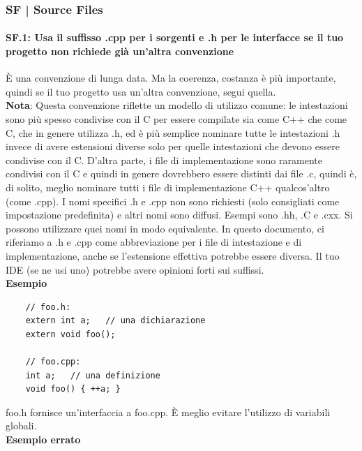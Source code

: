 \subsubsection{SF | Source Files}

\paragraph{SF.1: Usa il suffisso .cpp per i sorgenti e .h per le interfacce se il tuo progetto non richiede già un'altra convenzione}

\textsf{\small È una convenzione di lunga data. Ma la coerenza, costanza è più importante, quindi se il tuo progetto usa un'altra convenzione, segui quella. } \\

\textsf{\small \textbf{Nota}: Questa convenzione riflette un modello di utilizzo comune: le intestazioni sono più spesso condivise con il C per essere compilate sia come C++ che come C, che in genere utilizza .h, ed è più semplice nominare tutte le intestazioni .h invece di avere estensioni diverse solo per quelle intestazioni che devono essere condivise con il C. D'altra parte, i file di implementazione sono raramente condivisi con il C e quindi in genere dovrebbero essere distinti dai file .c, quindi è, di solito, meglio nominare tutti i file di implementazione C++ qualcos'altro (come .cpp). I nomi specifici .h e .cpp non sono richiesti (solo consigliati come impostazione predefinita) e altri nomi sono diffusi. Esempi sono .hh, .C e .cxx. Si possono utilizzare quei nomi in modo equivalente. In questo documento, ci riferiamo a .h e .cpp come abbreviazione per i file di intestazione e di implementazione, anche se l'estensione effettiva potrebbe essere diversa. Il tuo IDE (se ne usi uno) potrebbe avere opinioni forti sui suffissi.} \\

\textsf{\small \textbf{Esempio}}

\begin{lstlisting}
	// foo.h:
	extern int a;   // una dichiarazione
	extern void foo();
	
	// foo.cpp:
	int a;   // una definizione
	void foo() { ++a; }
\end{lstlisting}

\textsf{\small foo.h fornisce un'interfaccia a foo.cpp. È meglio evitare l'utilizzo di variabili globali.} \\

\textsf{\small \textbf{Esempio errato}}

